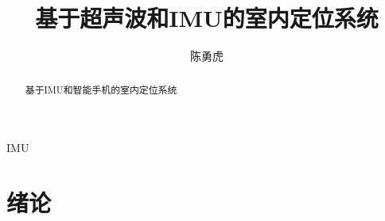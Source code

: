\documentclass[winfonts]{njuthesis}
\title{基于超声波和IMU的室内定位系统}
\author{陈勇虎}
\begin{document}
\maketitle
\controlpage %

\begin{abstract}


基于IMU和智能手机的室内定位系统

\end{abstract}

\begin{englishabstract}
IMU
\end{englishabstract}

%
%
%
%

\tableofcontents



\mainmatter

\chapter{绪论}\label{chapter_introduction}
\end{document}
